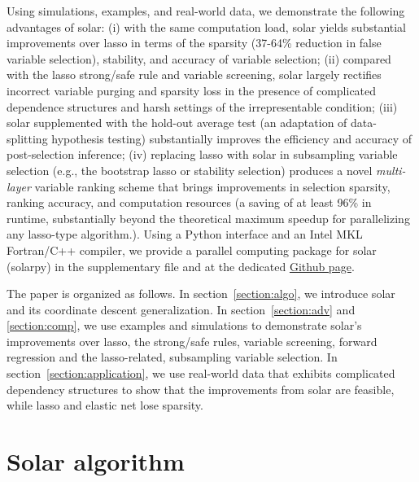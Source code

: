 \documentclass[11pt,authoryear]{elsarticle}
\begin{document}
Using simulations, examples, and real-world data, we demonstrate the following advantages of solar: (i) with the same computation load, solar yields substantial improvements over lasso in terms of the sparsity (37-64\% reduction in false variable selection), stability, and accuracy of variable selection; (ii) compared with the lasso strong/safe rule and variable screening, solar largely rectifies incorrect variable purging and sparsity loss in the presence of complicated dependence structures and harsh settings of the irrepresentable condition; (iii) solar supplemented with the hold-out average test (an adaptation of data-splitting hypothesis testing) substantially improves the efficiency and accuracy of post-selection inference; (iv) replacing lasso with solar in subsampling variable selection (e.g., the bootstrap lasso or stability selection) produces a novel \emph{multi-layer} variable ranking scheme that brings improvements in selection sparsity, ranking accuracy, and computation resources (a saving of at least 96\% in runtime, substantially beyond the theoretical maximum speedup for parallelizing any lasso-type algorithm.). Using a Python interface and an Intel MKL Fortran/C++ compiler, we provide a parallel computing package for solar (solarpy) in the supplementary file and at the dedicated \href{https://github.com/isaac2math/solarpy}{Github page}.

The paper is organized as follows. In section~\ref{section:algo}, we introduce solar and its coordinate descent generalization. In section~\ref{section:adv} and \ref{section:comp}, we  use examples and simulations to demonstrate solar's improvements over lasso, the strong/safe rules, variable screening, forward regression and the lasso-related, subsampling variable selection. In section~\ref{section:application}, we use real-world data that exhibits complicated dependency structures to show that the improvements from solar are feasible, while lasso and elastic net lose sparsity.


\section{Solar algorithm \label{section:algo}}
\end{document}
